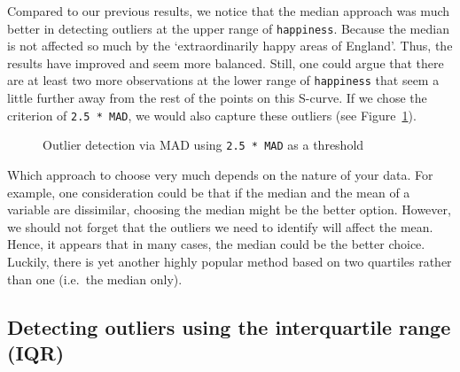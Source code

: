 \documentclass[
  letterpaper,
  DIV=11,
  numbers=noendperiod]{scrreprt}
\begin{document}
Compared to our previous results, we notice that the median approach was
much better in detecting outliers at the upper range of
\texttt{happiness}. Because the median is not affected so much by the
`extraordinarily happy areas of England'. Thus, the results have
improved and seem more balanced. Still, one could argue that there are
at least two more observations at the lower range of \texttt{happiness}
that seem a little further away from the rest of the points on this
S-curve. If we chose the criterion of \texttt{2.5\ *\ MAD}, we would
also capture these outliers (see
Figure~\ref{fig-MAD2-outlier-detection}).

\begin{figure}


\caption{\label{fig-MAD2-outlier-detection}Outlier detection via MAD
using \texttt{2.5\ *\ MAD} as a threshold}

\end{figure}%

Which approach to choose very much depends on the nature of your data.
For example, one consideration could be that if the median and the mean
of a variable are dissimilar, choosing the median might be the better
option. However, we should not forget that the outliers we need to
identify will affect the mean. Hence, it appears that in many cases, the
median could be the better choice. Luckily, there is yet another highly
popular method based on two quartiles rather than one (i.e.~the median
only).

\subsection{Detecting outliers using the interquartile range
(IQR)}\label{sec-outliers-iqr}
\end{document}
